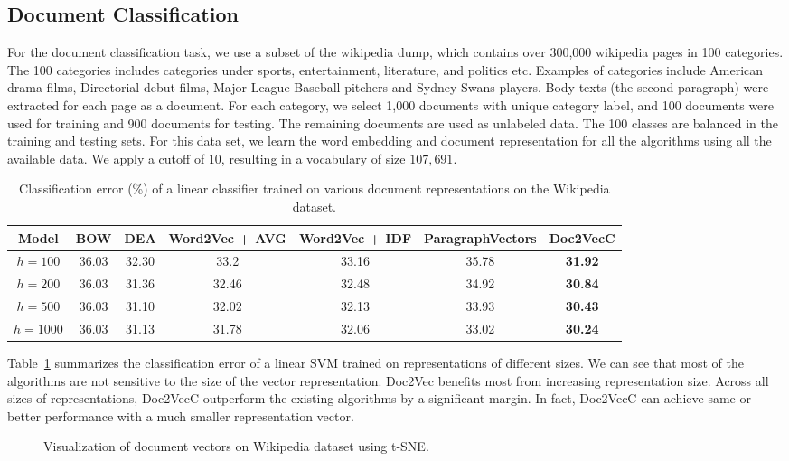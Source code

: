 \documentclass{article} \usepackage{iclr2017_conference,times}
\newcommand{\name}{Doc2VecC}
\begin{document}
\subsection{Document Classification}
For the document classification task, we use a subset of the wikipedia dump, which contains over 300,000 wikipedia pages in 100 categories. The 100 categories includes categories under sports, entertainment, literature, and politics etc. Examples of categories include American drama films,  Directorial debut films, Major League Baseball pitchers and Sydney Swans players.  Body texts (the second paragraph) were extracted for each page as a document. For each category, we select 1,000 documents with unique category label, and 100 documents were used for training and 900 documents for testing. The remaining documents are used as unlabeled data. The 100 classes are balanced in the training and testing sets. For this data set, we learn the word embedding and document representation for all the algorithms using all the available data.  We apply a cutoff of 10, resulting in a vocabulary of size $107,691$. 

\begin{table}
\caption{Classification error (\%) of a linear classifier trained on various document representations on the Wikipedia dataset. }
\label{tbl:wiki}
\centering
\begin{tabular}{|c||c|c|c|c|c|c|}
\hline
Model &  BOW & DEA & Word2Vec + AVG & Word2Vec + IDF & ParagraphVectors & \name\\
\hline 
\hline
$h = 100$ & 36.03 & 32.30 & 33.2 & 33.16 & 35.78& \textbf{31.92} \\
$h = 200 $ & 36.03 & 31.36 & 32.46 & 32.48& 34.92 & \textbf{30.84}\\
$h = 500 $ & 36.03 & 31.10 & 32.02 & 32.13& 33.93 & \textbf{30.43}\\
$h = 1000 $ & 36.03 & 31.13 &  31.78 & 32.06 & 33.02 & \textbf{30.24}\\
\hline
\end{tabular}
\end{table}
Table~\ref{tbl:wiki} summarizes the classification error of a linear SVM trained on representations of different sizes. We can see that most of the algorithms are not sensitive to the size of the vector representation. Doc2Vec benefits most from increasing representation size. Across all sizes of representations, \name{} outperform the existing algorithms by a significant margin. In fact, \name{} can achieve same or better performance with a much smaller representation vector. 
\begin{figure}\centering
    \subfloat[\name{}]{{\texttt{[image: embedding.png]} }}\caption{Visualization of document vectors on Wikipedia dataset using t-SNE.}\label{fig:comp}\end{figure}
\end{document}
